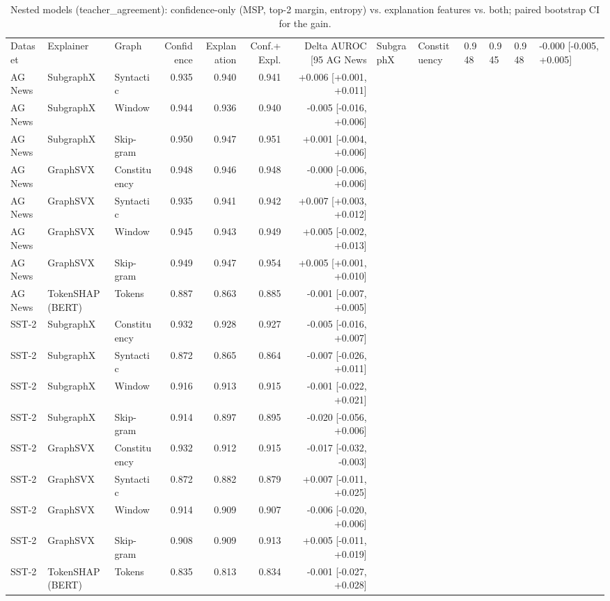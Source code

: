 \begin{table}[H]
\centering
\small
\caption{Nested models (teacher_agreement): confidence-only (MSP, top-2 margin, entropy) vs. explanation features vs. both; paired bootstrap CI for the gain.}
\label{tab:nested_teacher_agreement}
\begin{tabular}{lllrrrr}
\toprule
Dataset & Explainer & Graph & Confidence & Explanation & Conf.+Expl. & Delta AUROC [95%
\midrule
AG News & SubgraphX & Constituency & 0.948 & 0.945 & 0.948 & -0.000 [-0.005, +0.005] \\
AG News & SubgraphX & Syntactic & 0.935 & 0.940 & 0.941 & +0.006 [+0.001, +0.011] \\
AG News & SubgraphX & Window & 0.944 & 0.936 & 0.940 & -0.005 [-0.016, +0.006] \\
AG News & SubgraphX & Skip-gram & 0.950 & 0.947 & 0.951 & +0.001 [-0.004, +0.006] \\
AG News & GraphSVX & Constituency & 0.948 & 0.946 & 0.948 & -0.000 [-0.006, +0.006] \\
AG News & GraphSVX & Syntactic & 0.935 & 0.941 & 0.942 & +0.007 [+0.003, +0.012] \\
AG News & GraphSVX & Window & 0.945 & 0.943 & 0.949 & +0.005 [-0.002, +0.013] \\
AG News & GraphSVX & Skip-gram & 0.949 & 0.947 & 0.954 & +0.005 [+0.001, +0.010] \\
AG News & TokenSHAP (BERT) & Tokens & 0.887 & 0.863 & 0.885 & -0.001 [-0.007, +0.005] \\
SST-2 & SubgraphX & Constituency & 0.932 & 0.928 & 0.927 & -0.005 [-0.016, +0.007] \\
SST-2 & SubgraphX & Syntactic & 0.872 & 0.865 & 0.864 & -0.007 [-0.026, +0.011] \\
SST-2 & SubgraphX & Window & 0.916 & 0.913 & 0.915 & -0.001 [-0.022, +0.021] \\
SST-2 & SubgraphX & Skip-gram & 0.914 & 0.897 & 0.895 & -0.020 [-0.056, +0.006] \\
SST-2 & GraphSVX & Constituency & 0.932 & 0.912 & 0.915 & -0.017 [-0.032, -0.003] \\
SST-2 & GraphSVX & Syntactic & 0.872 & 0.882 & 0.879 & +0.007 [-0.011, +0.025] \\
SST-2 & GraphSVX & Window & 0.914 & 0.909 & 0.907 & -0.006 [-0.020, +0.006] \\
SST-2 & GraphSVX & Skip-gram & 0.908 & 0.909 & 0.913 & +0.005 [-0.011, +0.019] \\
SST-2 & TokenSHAP (BERT) & Tokens & 0.835 & 0.813 & 0.834 & -0.001 [-0.027, +0.028] \\
\bottomrule
\end{tabular}
\end{table}

